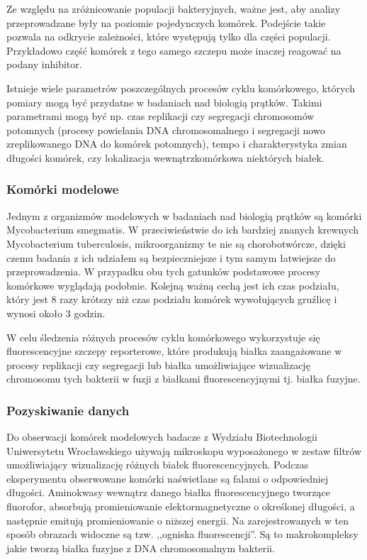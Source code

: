 \documentclass[declaration,shortabstract,mgr]{iithesis}
\begin{document}
Ze względu na zróżnicowanie populacji bakteryjnych, ważne jest, aby analizy przeprowadzane były na poziomie pojedynczych komórek.
Podejście takie pozwala na odkrycie zależności, które występują tylko dla części populacji.
Przykładowo część komórek z tego samego szczepu może inaczej reagować na podany inhibitor.

Istnieje wiele parametrów poszczególnych procesów cyklu komórkowego, których pomiary mogą być przydatne w badaniach nad biologią prątków.
Takimi parametrami mogą być np. czas replikacji czy segregacji chromosomów potomnych (procesy powielania DNA chromosomalnego i segregacji nowo zreplikowanego DNA do komórek potomnych), tempo i charakterystyka zmian długości komórek, czy lokalizacja wewnątrzkomórkowa niektórych białek.

\subsubsection{Komórki modelowe}

Jednym z organizmów modelowych w badaniach nad biologią prątków są komórki Mycobacterium smegmatis.
W przeciwieństwie do ich bardziej znanych krewnych Mycobacterium tuberculosis, mikroorganizmy te nie są chorobotwórcze, dzięki czemu badania z ich udziałem są bezpieczniejsze i tym samym łatwiejsze do przeprowadzenia.
W przypadku obu tych gatunków podstawowe procesy komórkowe wyglądają podobnie.
Kolejną ważną cechą jest ich czas podziału, który jest 8 razy krótszy niż czas podziału komórek wywołujących gruźlicę i wynosi około 3 godzin.

W celu śledzenia różnych procesów cyklu komórkowego wykorzystuje się fluorescencyjne szczepy reporterowe, które produkują białka zaangażowane w procesy replikacji czy segregacji lub białka umożliwiające wizualizację chromosomu tych bakterii w fuzji z białkami fluorescencyjnymi tj. białka fuzyjne.

\subsubsection{Pozyskiwanie danych}

Do obserwacji komórek modelowych badacze z Wydziału Biotechnologii Uniwersytetu Wrocławskiego używają mikroskopu wyposażonego w zestaw filtrów umożliwiający wizualizację różnych białek fluorescencyjnych.
Podczas eksperymentu obserwowane komórki naświetlane są falami o odpowiedniej długości.
Aminokwasy wewnątrz danego białka fluorescencyjnego tworzące fluorofor, absorbują promieniowanie elektormagnetyczne o określonej długości, a następnie emitują promieniowanie o niższej energii.
Na zarejestrowanych w ten sposób obrazach widoczne są tzw. ,,ogniska fluorescencji''.
Są to makrokompleksy jakie tworzą białka fuzyjne z DNA chromosomalnym bakterii.
\end{document}
